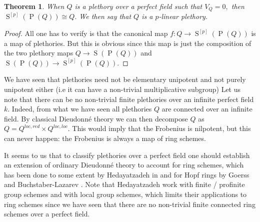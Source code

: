 \documentclass[a4paper, 12pt]{amsart}
\DeclareMathOperator{\Prim}{P}
\DeclareMathOperator{\Sym}{S}
\numberwithin{equation}{section}
\newtheorem{theorem}{Theorem}[section]
\theoremstyle{definition}
\begin{document}
\begin{theorem}
When $Q$ is a plethory over a perfect field such that $V_Q=0,$ then $\Sym^{[p]}(\Prim(Q)) \cong Q.$  We then say that $Q$ is a $p$-linear plethory.
\end{theorem}
\begin{proof}
All one has to verify is that the canonical map $f:Q \rightarrow \Sym^{[p]}(\Prim(Q))$ is a map of plethories. But this is obvious since this map is just the composition of the two plethory maps $Q \rightarrow \Sym(\Prim(Q))$ and $\Sym(\Prim(Q)) \rightarrow \Sym^{[p]}(\Prim(Q)).$  
\end{proof}
\begin{remark}
We have seen that plethories need not be elementary unipotent and not purely unipotent either (i.e it can have a non-trivial multiplicative subgroup) Let us note that there can be no non-trivial finite plethories over an infinite perfect field $k.$ Indeed, from what we have seen all plethories $Q$ are connected over an infinite field. By classical Dieudonné theory we can then decompose $Q$ as $Q = Q^{loc,red} \times Q^{loc,loc}.$ This would imply that the Frobenius is nilpotent, but this can never happen: the Frobenius is always a map of ring schemes. 
\end{remark}
\noindent It seems to us that to classify plethories over a perfect field one should establish an extension of ordinary Dieudonné theory to account for ring schemes, which has been done to some extent by Hedayatzadeh in \cite{HadiT} and for Hopf rings by Goerss \cite{GoerssH} and Buchstaber-Lazarev \cite{Buchstaber}. Note that Hedayatzadeh work with finite / profinite group schemes and with local group schemes, which  limits their applications to ring schemes since we have seen that there are no non-trivial finite connected ring schemes over a perfect field. 

{}

\end{document}
